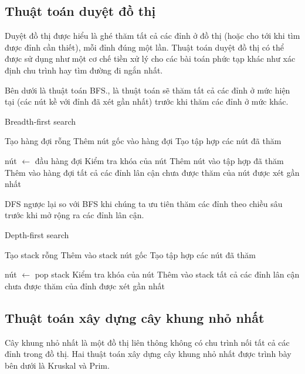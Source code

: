 \documentclass{hust}
\begin{document}
\subsection{Thuật toán duyệt đồ thị}
Duyệt đồ thị được hiểu là ghé thăm tất cả các đỉnh ở đồ thị (hoặc cho tới khi tìm được đỉnh cần thiết), mỗi đỉnh đúng một lần. Thuật toán duyệt đồ thị có thể được sử dụng như một cơ chế tiền xử lý cho các bài toán phức tạp khác như xác định chu trình hay tìm đường đi ngắn nhất.


Bên dưới là thuật toán \Gls{BFS}., là thuật toán sẽ thăm tất cả các đỉnh ở mức hiện tại (các nút kề với đỉnh đã xét gần nhất) trước khi thăm các đỉnh ở mức khác.

\begin{algorithm}
	\caption{Breadth-first search}\label{euclid}
	\begin{algorithmic}[1]
		\State Tạo hàng đợi rỗng
		\State Thêm nút gốc vào hàng đợi
		\State Tạo tập hợp các nút đã thăm
		
		\State nút $\leftarrow$ đầu hàng đợi
		\State Kiểm tra khóa của nút
		\State Thêm nút vào tập hợp đã thăm
		\State Thêm vào hàng đợi tất cả các đỉnh lân cận chưa được thăm của nút được xét gần nhất
		\EndWhile
		\EndProcedure
	\end{algorithmic}
\end{algorithm}


\Gls{DFS} ngược lại so với \gls{BFS} khi chúng ta ưu tiên thăm các đỉnh theo chiều sâu trước khi mở rộng ra các đỉnh lân cận.


\begin{algorithm}
	\caption{Depth-first search}\label{euclid}
	\begin{algorithmic}[1]
		\State Tạo stack rỗng 
		\State Thêm vào stack nút gốc
		\State Tạo tập hợp các nút đã thăm 
		
		\State nút $\leftarrow$ pop stack
		\State Kiểm tra khóa của nút
		\State Thêm vào stack tất cả các đỉnh lân cận chưa được thăm của đỉnh được xét gần nhất
		\EndWhile
		\EndProcedure
	\end{algorithmic}
\end{algorithm}

\subsection{Thuật toán xây dựng cây khung nhỏ nhất}
Cây khung nhỏ nhất là một đồ thị liên thông không có chu trình nối tất cả các đỉnh trong đồ thị. Hai thuật toán xây dựng cây khung nhỏ nhất được trình bày bên dưới là Kruskal và Prim.
\end{document}
